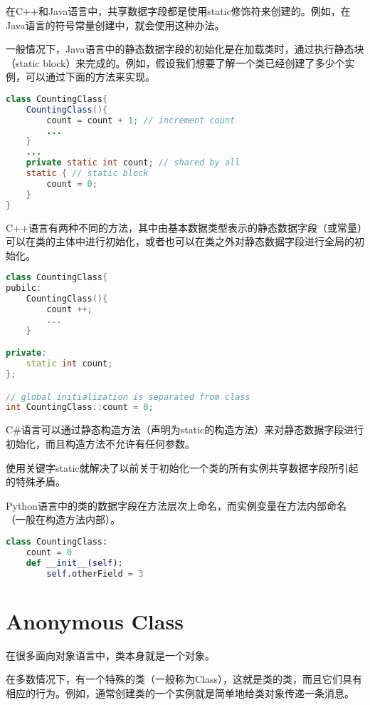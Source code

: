 在C++和Java语言中，共享数据字段都是使用static修饰符来创建的。例如，在Java语言的符号常量创建中，就会使用这种办法。

一般情况下，Java语言中的静态数据字段的初始化是在加载类时，通过执行静态块（static block）来完成的。例如，假设我们想要了解一个类已经创建了多少个实例，可以通过下面的方法来实现。

\begin{lstlisting}[language=Java]
class CountingClass{
	CountingClass(){
		count = count + 1; // increment count
		...
	}
	...
	private static int count; // shared by all
	static { // static block
		count = 0;
	}
}
\end{lstlisting}

C++语言有两种不同的方法，其中由基本数据类型表示的静态数据字段（或常量）可以在类的主体中进行初始化，或者也可以在类之外对静态数据字段进行全局的初始化。



\begin{lstlisting}[language=C++]
class CountingClass{
pubilc:
	CountingClass(){
		count ++;
		...
	}

private:
	static int count;
};

// global initialization is separated from class
int CountingClass::count = 0;
\end{lstlisting}

C\#语言可以通过静态构造方法（声明为static的构造方法）来对静态数据字段进行初始化，而且构造方法不允许有任何参数。


使用关键字static就解决了以前关于初始化一个类的所有实例共享数据字段所引起的特殊矛盾。

Python语言中的类的数据字段在方法层次上命名，而实例变量在方法内部命名（一般在构造方法内部）。

\begin{lstlisting}[language=Python]
class CountingClass:
	count = 0
	def __init__(self):
		self.otherField = 3
\end{lstlisting}



\section{Anonymous Class}

在很多面向对象语言中，类本身就是一个对象。

在多数情况下，有一个特殊的类（一般称为Class），这就是类的类，而且它们具有相应的行为。例如，通常创建类的一个实例就是简单地给类对象传递一条消息。




